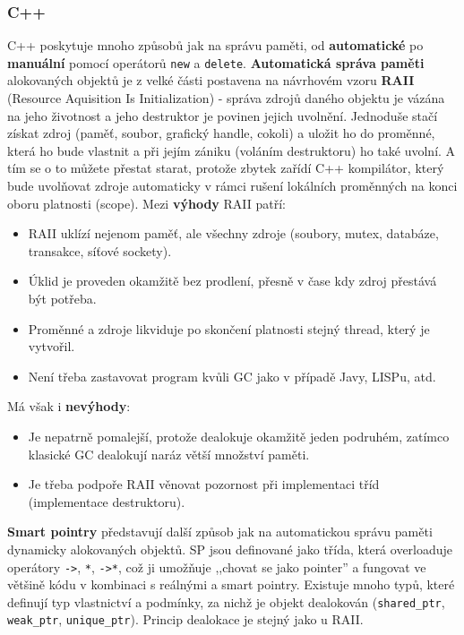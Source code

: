 \subsubsection{C++}
C++ poskytuje mnoho způsobů jak na správu paměti, od \textbf{automatické} po \textbf{manuální} pomocí operátorů \texttt{new} a \texttt{delete}. \textbf{Automatická správa paměti} alokovaných objektů je z velké části postavena na návrhovém vzoru \textbf{RAII} (Resource Aquisition Is Initialization) - správa zdrojů daného objektu je vázána na jeho životnost a jeho destruktor je povinen jejich uvolnění. Jednoduše stačí získat zdroj (paměť, soubor, grafický handle, cokoli) a uložit ho do proměnné, která ho bude vlastnit a při jejím zániku (voláním destruktoru) ho také uvolní. A tím se o to můžete přestat starat, protože zbytek zařídí C++ kompilátor, který bude uvolňovat zdroje automaticky v rámci rušení lokálních proměnných na konci oboru platnosti (scope). Mezi \textbf{výhody} RAII patří:
\begin{itemize}
\item RAII uklízí nejenom paměť, ale všechny zdroje (soubory, mutex, databáze, transakce, síťové sockety).
\item Úklid je proveden okamžitě bez prodlení, přesně v čase kdy zdroj přestává být potřeba.
\item Proměnné a zdroje likviduje po skončení platnosti stejný thread, který je vytvořil.
\item Není třeba zastavovat program kvůli GC jako v případě Javy, LISPu, atd.
\end{itemize}
Má však i \textbf{nevýhody}:
\begin{itemize}
\item Je nepatrně pomalejší, protože dealokuje okamžitě jeden podruhém, zatímco klasické GC dealokují naráz větší množství paměti.
\item Je třeba podpoře RAII věnovat pozornost při implementaci tříd (implementace destruktoru).
\end{itemize}

\textbf{Smart pointry} představují další způsob jak na automatickou správu paměti dynamicky alokovaných objektů. SP jsou definované jako třída, která overloaduje operátory \texttt{->}, \texttt{*}, \texttt{->*}, což ji umožňuje ,,chovat se jako pointer'' a fungovat ve většině kódu v kombinaci s reálnými a smart pointry. Existuje mnoho typů, které definují typ vlastnictví a podmínky, za nichž je objekt dealokován (\texttt{shared\_ptr}, \texttt{weak\_ptr}, \texttt{unique\_ptr}). Princip dealokace je stejný jako u RAII.

